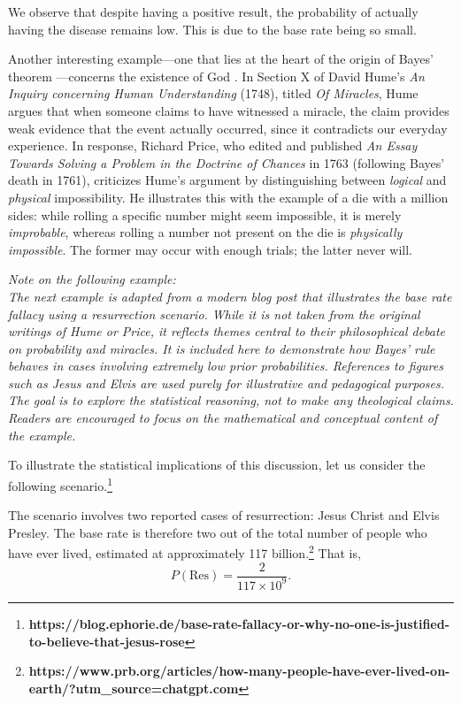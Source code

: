 We observe that despite having a positive result, the probability of actually having the disease remains low. This is due to the base rate being so small.

Another interesting example—one that lies at the heart of the origin of Bayes' theorem \cite{bayes1763lii}—concerns the existence of God \cite{stigler2018richard}. In Section X of David Hume’s \emph{An Inquiry concerning Human Understanding} (1748), titled \emph{Of Miracles}, Hume argues that when someone claims to have witnessed a miracle, the claim provides weak evidence that the event actually occurred, since it contradicts our everyday experience. In response, Richard Price, who edited and published \emph{An Essay Towards Solving a Problem in the Doctrine of Chances} in 1763 (following Bayes’ death in 1761), criticizes Hume’s argument by distinguishing between \emph{logical} and \emph{physical} impossibility. He illustrates this with the example of a die with a million sides: while rolling a specific number might seem impossible, it is merely \emph{improbable}, whereas rolling a number not present on the die is \emph{physically impossible}. The former may occur with enough trials; the latter never will.

\noindent\textit{Note on the following example:} \\
\textit{The next example is adapted from a modern blog post that illustrates the base rate fallacy using a resurrection scenario. While it is not taken from the original writings of Hume or Price, it reflects themes central to their philosophical debate on probability and miracles. It is included here to demonstrate how Bayes’ rule behaves in cases involving extremely low prior probabilities. References to figures such as Jesus and Elvis are used purely for illustrative and pedagogical purposes. The goal is to explore the statistical reasoning, not to make any theological claims. Readers are encouraged to focus on the mathematical and conceptual content of the example.}

To illustrate the statistical implications of this discussion, let us consider the following scenario.\footnote{\textbf{https://blog.ephorie.de/base-rate-fallacy-or-why-no-one-is-justified-to-believe-that-jesus-rose}}

The scenario involves two reported cases of resurrection: Jesus Christ and Elvis Presley. The base rate is therefore two out of the total number of people who have ever lived, estimated at approximately 117 billion.\footnote{\textbf{https://www.prb.org/articles/how-many-people-have-ever-lived-on-earth/?utm\_source=chatgpt.com}} That is,
\[
P(\text{Res}) = \frac{2}{117 \times 10^9}.
\]

